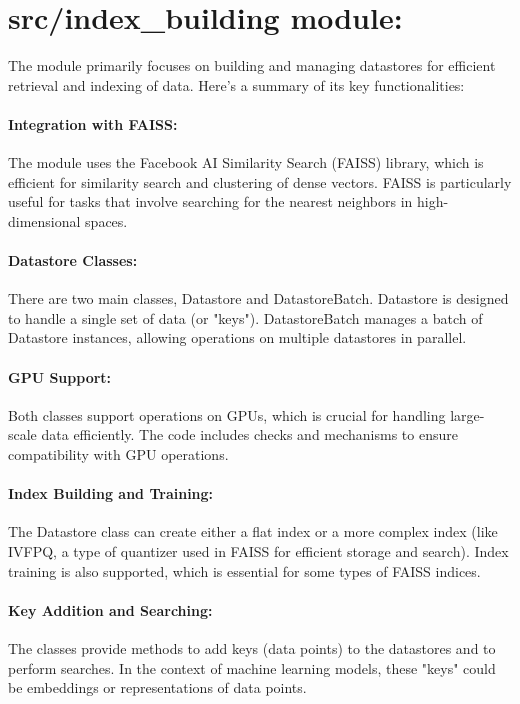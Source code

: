 \documentclass[12pt]{article}
\begin{document}

\section*{src/index\_building module:} The module primarily focuses on building
and managing datastores for efficient retrieval and indexing of data. Here's a
summary of its key functionalities:

\paragraph{Integration with FAISS:} The module uses the Facebook AI Similarity
Search (FAISS) library, which is efficient for similarity search and clustering
of dense vectors. FAISS is particularly useful for tasks that involve searching
for the nearest neighbors in high-dimensional spaces.

\paragraph{Datastore Classes:} There are two main classes, Datastore and
DatastoreBatch. Datastore is designed to handle a single set of data (or
"keys"). DatastoreBatch manages a batch of Datastore instances, allowing
operations on multiple datastores in parallel.

\paragraph{GPU Support:} Both classes support operations on GPUs, which is
crucial for handling large-scale data efficiently. The code includes checks and
mechanisms to ensure compatibility with GPU operations.

\paragraph{Index Building and Training:} The Datastore class can create either
a flat index or a more complex index (like IVFPQ, a type of quantizer used in
FAISS for efficient storage and search). Index training is also supported,
which is essential for some types of FAISS indices.

\paragraph{Key Addition and Searching:} The classes provide methods to add keys
(data points) to the datastores and to perform searches. In the context of
machine learning models, these "keys" could be embeddings or representations of
data points.
\end{document}
